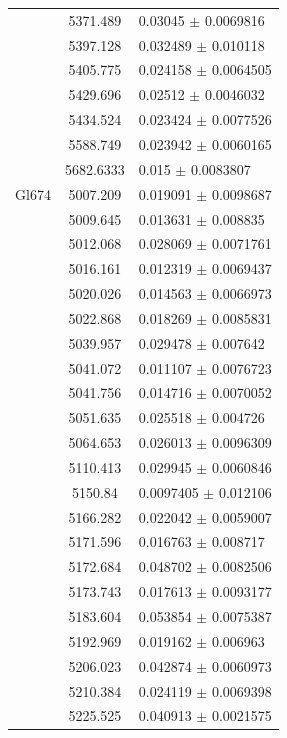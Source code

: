 \begin{longtable}{|c|c|l|}
 & 5371.489 & 0.03045 $\pm$ 0.0069816 \\        
 & 5397.128 & 0.032489 $\pm$ 0.010118 \\        
 & 5405.775 & 0.024158 $\pm$ 0.0064505 \\       
 & 5429.696 & 0.02512 $\pm$ 0.0046032 \\        
 & 5434.524 & 0.023424 $\pm$ 0.0077526 \\       
 & 5588.749 & 0.023942 $\pm$ 0.0060165 \\       
 & 5682.6333 & 0.015 $\pm$ 0.0083807 \\         
\hline                                          
Gl674 & 5007.209 & 0.019091 $\pm$ 0.0098687 \\  
 & 5009.645 & 0.013631 $\pm$ 0.008835 \\        
 & 5012.068 & 0.028069 $\pm$ 0.0071761 \\       
 & 5016.161 & 0.012319 $\pm$ 0.0069437 \\       
 & 5020.026 & 0.014563 $\pm$ 0.0066973 \\       
 & 5022.868 & 0.018269 $\pm$ 0.0085831 \\       
 & 5039.957 & 0.029478 $\pm$ 0.007642 \\        
 & 5041.072 & 0.011107 $\pm$ 0.0076723 \\       
 & 5041.756 & 0.014716 $\pm$ 0.0070052 \\       
 & 5051.635 & 0.025518 $\pm$ 0.004726 \\        
 & 5064.653 & 0.026013 $\pm$ 0.0096309 \\       
 & 5110.413 & 0.029945 $\pm$ 0.0060846 \\       
 & 5150.84 & 0.0097405 $\pm$ 0.012106 \\        
 & 5166.282 & 0.022042 $\pm$ 0.0059007 \\       
 & 5171.596 & 0.016763 $\pm$ 0.008717 \\        
 & 5172.684 & 0.048702 $\pm$ 0.0082506 \\       
 & 5173.743 & 0.017613 $\pm$ 0.0093177 \\       
 & 5183.604 & 0.053854 $\pm$ 0.0075387 \\       
 & 5192.969 & 0.019162 $\pm$ 0.006963 \\        
 & 5206.023 & 0.042874 $\pm$ 0.0060973 \\       
 & 5210.384 & 0.024119 $\pm$ 0.0069398 \\       
 & 5225.525 & 0.040913 $\pm$ 0.0021575 \\       

\end{longtable}
